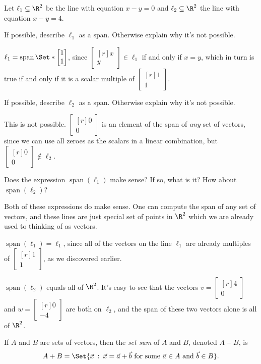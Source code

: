 \documentclass{problemset}
\DeclareMathOperator{\Span}{span}
\newcommand{\mat}[1]{\begin{bmatrix*}[r]#1\end{bmatrix*}}
\providecommand\given{}
\newcommand\SetSymbol[1][]{%
	\nonscript\::%
	\allowbreak
	\nonscript\:
	\mathopen{}}
\renewcommand\given{\SetSymbol[\delimsize]}
\begin{document}
	\question
	Let $\ell_1\subseteq \R^2$ be the line with equation $x-y=0$ and $\ell_2\subseteq\R^2$
	the line with equation $x-y=4$.
	\begin{parts}
		\item If possible, describe $\ell_1$ as a span. Otherwise explain why 
			it's not possible.
			\begin{solution}
				$\ell_1 = \Span\Set*{\mat{1\\1}}$, since $\mat{x\\y} \in \ell_1$ 
				if and only if $x = y$, which in turn is true if and only if it 
				is a scalar multiple of $\mat{1\\1}$. 
			\end{solution}
		\item If possible, describe $\ell_2$ as a span. Otherwise explain why it's 
			not possible.
			\begin{solution}
				This is not possible. $\mat{0\\0}$ is an element of	the span of 
				\emph{any} set of vectors, since we can use all zeroes as the 
				scalars in a linear combination, but $\mat{0\\0} \notin \ell_2$.
			\end{solution}
		\item Does the expression $\Span(\ell_1)$ make sense? If so, what is it? 
			How about $\Span(\ell_2)$?
			\begin{solution}
				Both of these expressions do make sense. One can compute the span
				of any set of vectors, and these lines are just special set of 
				points in $\R^2$ which we are already used to thinking of as vectors.

				$\Span(\ell_1) = \ell_1$, since all of the vectors on 
				the line $\ell_1$ are already multiples of $\mat{1\\1}$, as we 
				discovered earlier. 

				$\Span(\ell_2)$ equals all of $\R^2$. It's easy to see that the 
				vectors $v = \mat{4\\0}$ and $w = \mat{0\\-4}$ are both on $\ell_2$, 
				and the span of these two vectors alone is all of $\R^2$. 
			\end{solution}
	\end{parts}


	\begin{definition}
		If $A$ and $B$ are sets of vectors, then the \emph{set sum} of $A$
		and $B$, denoted $A+B$, is
		\[
			A+B=\Set{\vec x \given \vec x=\vec a+\vec b\text{ for some }\vec a\in A\text{ and }
			\vec b\in B}.
		\]
	\end{definition}
\end{document}
